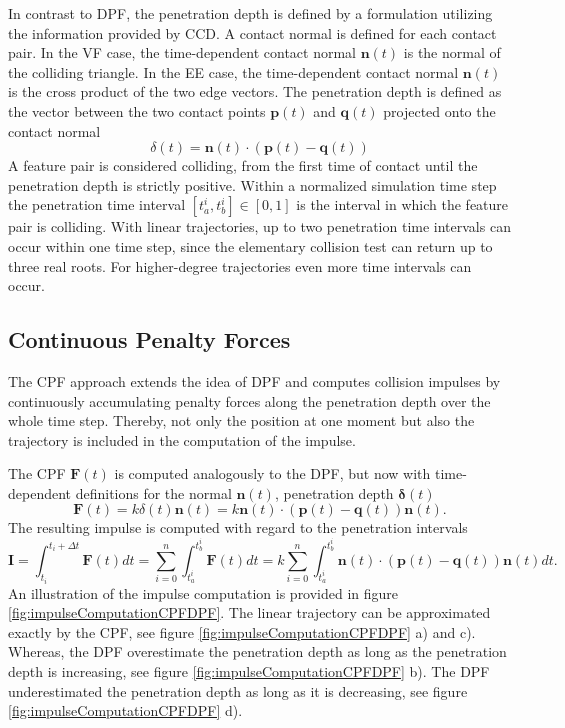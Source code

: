 In contrast to DPF, the penetration depth is defined by a formulation utilizing the information provided by CCD. A contact normal is defined for each contact pair. In the VF case, the time-dependent contact normal $\mathbf n(t)$ is the normal of the colliding triangle. In the EE case, the time-dependent contact normal $\mathbf n(t)$ is the cross product of the two edge vectors. The penetration depth is defined as the vector between the two contact points $\mathbf p(t)$ and $\mathbf q(t)$ projected onto the contact normal
\begin{equation}
       	\delta(t)  =\mathbf{n}(t) \cdot  (\mathbf p (t) - \mathbf q (t))
\end{equation}
A feature pair is considered colliding, from the first time of contact until the penetration depth is strictly positive. Within a normalized simulation time step the penetration time interval $[t^i_a , t^i_b] \in [0,1]$ is the interval in which the feature pair is colliding.
With linear trajectories, up to two penetration time intervals can occur within one time step, since the elementary collision test can return up to three real roots. For higher-degree trajectories even more time intervals can occur.

\subsection{Continuous Penalty Forces}
\label{sec:CPFGENERAL}
The CPF approach extends the idea of DPF and computes collision impulses by continuously accumulating penalty forces along the penetration depth over the whole time step. Thereby, not only the position at one moment but also the trajectory is included in the computation of the impulse.

The CPF $\mathbf F (t)$ is computed analogously to the DPF, but now with time-dependent definitions for the normal $\mathbf n (t)$, penetration depth $\mathbf{\delta}(t)$
\begin{equation}
    \mathbf  F(t) = k \delta (t) \mathbf{n} (t) = k\mathbf{n}(t) \cdot  (\mathbf p(t) - \mathbf q (t)) \mathbf{n} (t).
\end{equation}
The resulting impulse is computed with regard to the penetration intervals
\begin{equation}
\label{eq::CPF_impulse}
     \mathbf I = \int_{t_i}^{t_i+\Delta t} \mathbf F(t)dt= \sum\limits_{i=0}^{n}\int_{t_a^i}^{t_b^i}\mathbf F(t)dt=k \sum\limits_{i=0}^{n}\int_{t_a^i}^{t_b^i} \mathbf{n}(t) \cdot   (\mathbf p(t) - \mathbf q (t)) \mathbf{n} (t)dt.
\end{equation}
An illustration of the impulse computation is provided in figure \ref{fig:impulseComputationCPFDPF}. The linear trajectory can be approximated exactly by the CPF, see figure \ref{fig:impulseComputationCPFDPF} a) and c). Whereas, the DPF overestimate the penetration depth as long as the penetration depth is increasing, see figure \ref{fig:impulseComputationCPFDPF} b). The DPF underestimated the penetration depth as long as it is decreasing, see figure \ref{fig:impulseComputationCPFDPF} d).

